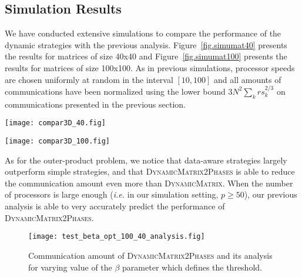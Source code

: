 \documentclass[a4paper,10pt]{article}
\newcommand{\ie}{{\it i.e.}\xspace}
\newcommand{\stupidmat}{\textsc{Dynamic\-Matrix}\xspace}
\newcommand{\stupidthresholdmat}{\textsc{Dynamic\-Matrix\-2Phases}\xspace}
\begin{document}
\subsection{Simulation Results}



We have conducted extensive simulations to compare the performance of
the dynamic strategies with the previous analysis.
Figure~\ref{fig.simumat40} presents the results for matrices of size
40x40 and Figure~\ref{fig.simumat100} presents the results for matrices of size
100x100. As in previous simulations, processor speeds are chosen
uniformly at random in the interval $[10, 100]$ and all amounts of
communications have been normalized using the lower bound $3 N^2 \sum_k \mathit{rs}_k^{2/3}$ on
communications presented in the previous section.



\begin{figure*}[htbp]
  \centering
  \texttt{[image: compar3D\_40.fig]}
  \caption{Communication amounts of all strategies for matrices of size $N/l=40$
    blocks ($N^3/l^3 = 64,000$ tasks).}
  \label{fig.simumat40}
\end{figure*}

\begin{figure*}[htbp]
  \centering
  \texttt{[image: compar3D\_100.fig]}
  \caption{Communication amounts of all strategies for matrices of size $N/l=100$
    blocks ($N^3/l^3 = 1,000,000$ tasks).}
  \label{fig.simumat100}
\end{figure*}



As for the outer-product problem, we notice that data-aware strategies
largely outperform simple strategies, and that \stupidthresholdmat is
able to reduce the communication amount even more than \stupidmat. When
the number of processors is large enough (\ie in our simulation
setting, $p\geq 50$), our previous analysis is able to very accurately
predict the performance of \stupidthresholdmat.



\begin{figure}[htbp]
  \centering
  \texttt{[image: test\_beta\_opt\_100\_40\_analysis.fig]}
  \caption{Communication amount of \stupidthresholdmat and its
    analysis for varying value of the $\beta$ parameter which defines
    the threshold.}
  \label{fig.betamat}
\end{figure}
\end{document}
